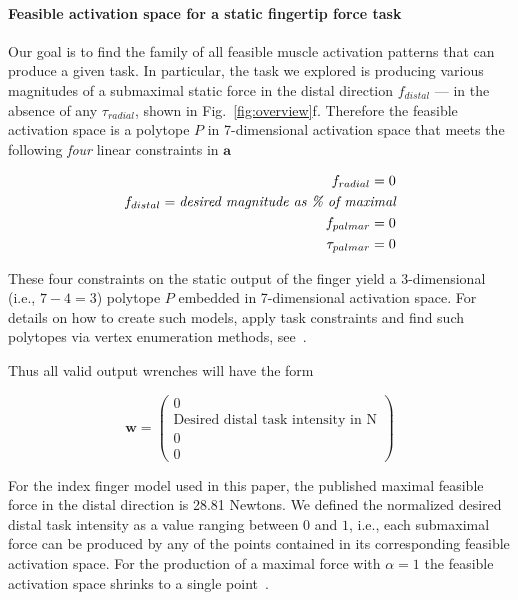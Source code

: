 \documentclass[9pt,twocolumn,twoside,lineno]{pnas-new}
\begin{document}
{\paragraph*{Feasible activation space for a static fingertip force task}

Our goal is to find the family of all feasible muscle activation patterns that can produce a given task. In particular, the task we explored is producing various magnitudes of a submaximal static force in the distal direction $f_{distal}$ --- in the absence of any $\tau_{radial}$, shown in Fig.~\ref{fig:overview}f. Therefore the feasible activation space is a polytope $P$ in 7-dimensional activation space that meets the following \emph{four} linear constraints in $\textbf{a}$~\cite{Valero-Cuevas1998Large,valero-cuevas2015fundamentals,Valero-Cuevas2000Scaling}

\begin{eqnarray}
f_{radial} = 0 \\
f_{distal} = \emph{desired magnitude as \% of maximal} \\
f_{palmar} = 0 \\
\tau_{palmar} = 0
\end{eqnarray}

These four constraints on the static output of the finger yield a 3-dimensional (i.e., $7-4=3$) polytope $P$ embedded in 7-dimensional activation space.
For details on how to create such models, apply task constraints and find such polytopes via vertex enumeration methods, see~\cite{valero-cuevas2015fundamentals}.

Thus all valid output wrenches will have the form

\begin{equation}
\label{eq:wrench}
\textbf{w}=
\begin{pmatrix}
0\\
\text{Desired distal task intensity in N} \\
0\\
0
\end{pmatrix}
\end{equation}

For the index finger model used in this paper, the published maximal feasible force in the distal direction is 28.81 Newtons. We defined the normalized desired distal task intensity as a value ranging between $0$ and $1$, i.e., each submaximal force can be produced by any of the points contained in its corresponding feasible activation space. For the production of a maximal force with $\alpha=1$ the feasible activation space shrinks to a single point~\cite{spoor1983balancing,Chao1978Graphical,chvatal1983linear,Valero-Cuevas2000Scaling}.

}
\end{document}
